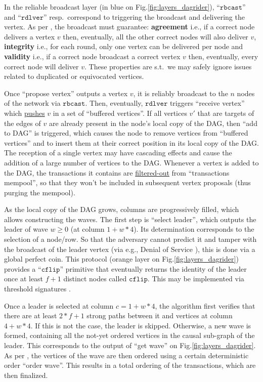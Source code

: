 In the reliable broadcast layer (in blue on Fig.\ref{fig:layers_dagrider}), ``$\mathtt{rbcast}$'' and ``$\mathtt{rdlver}$'' resp.~correspond to triggering the broadcast and delivering the vertex.
As per \cite{all_you_need_is_dag}, the broadcast must guarantee: \textbf{agreement} i.e., if a correct node delivers a vertex $v$ then, eventually, all the other correct nodes will also deliver $v$, \textbf{integrity} i.e., for each round, only one vertex can be delivered per node and \textbf{validity} i.e., if a correct node broadcast a correct vertex $v$ then, eventually, every correct node will deliver $v$.
These properties are s.t.~we may safely ignore issues related to duplicated or equivocated vertices.


Once ``propose vertex'' outputs a vertex $v$, it is reliably broadcast to the $n$ nodes of the network via $\mathtt{rbcast}$.
Then, eventually, $\mathtt{rdlver}$ triggers ``receive vertex'' which \ul{pushes} $v$ in a set of ``buffered vertices''.
If all vertices $v'$ that are targets of the edges of $v$ are already present in the node's local copy of the DAG, then ``add to DAG'' is triggered, which causes the node to remove vertices from ``buffered vertices'' and to insert them at their correct position in its local copy of the DAG.
The reception of a single vertex may have cascading effects and cause the addition of a large number of vertices to the DAG.
Whenever a vertex is added to the DAG, the transactions it contains are \ul{filtered-out} from ``transactions mempool'', so that they won't be included in subsequent vertex proposals (thus purging the mempool).


As the local copy of the DAG grows, columns are progressively filled, which allows constructing the waves.
The first step is ``select leader'', which outputs the leader of wave $w \geq 0$ (at column $1 + w*4$). 
Its determination corresponds to the selection of a node/row.
So that the adversary cannot predict it and tamper with the broadcast of the leader vertex (via e.g., Denial of Service \cite{a_framework_for_classifying_denial_of_service_attacks}), this is done via a global perfect coin. 
This protocol (orange layer on Fig.\ref{fig:layers_dagrider}) provides a ``$\mathtt{cflip}$'' primitive that eventually returns the identity of the leader once at least $f+1$ distinct nodes called $\mathtt{cflip}$. 
This may be implemented via threshold signatures \cite{practical_threshold_signatures}.


Once a leader is selected at column $c = 1 + w*4$, the algorithm first verifies that there are at least $2*f+1$ strong paths between it and vertices at column $4 + w*4$. 
If this is not the case, the leader is skipped.
Otherwise, a new wave is formed, containing all the not-yet ordered vertices in the causal sub-graph of the leader.
This corresponds to the output of ``get wave'' on Fig.\ref{fig:layers_dagrider}.
As per \cite{all_you_need_is_dag}, the vertices of the wave are then ordered using a certain deterministic order ``order wave''.
This results in a total ordering of the transactions, which are then finalized.



